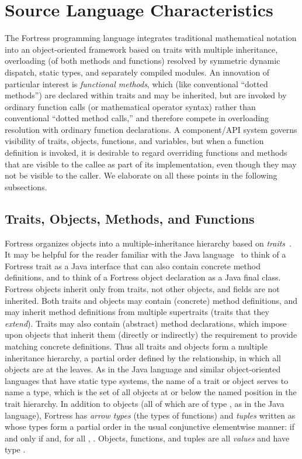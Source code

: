 \section{Source Language Characteristics}

The Fortress programming language integrates traditional mathematical
notation into an object-oriented framework based on traits with
multiple inheritance, overloading (of both methods and functions)
resolved by symmetric dynamic dispatch, static types, and separately
compiled modules.  An innovation of particular interest is
\emph{functional methods}, which (like conventional ``dotted methods'')
are declared within traits and may be inherited, but are invoked by
ordinary function calls (or mathematical operator syntax) rather
than conventional ``dotted method calls,'' and therefore compete
in overloading resolution with ordinary function declarations.
A component/API system governs visibility of traits, objects,
functions, and variables, but when a function definition is invoked,
it is desirable to regard overriding functions and
methods that are visible to the callee as part of its implementation,
even though they may not be visible to the caller.
We elaborate on all these points in the following subsections.

\subsection{Traits, Objects, Methods, and Functions}

Fortress organizes objects into a multiple-inheritance hierarchy based
on {\it traits}~\cite{traits,traitsOOPSLA04}.  It may be helpful for the reader familiar with the Java language~\cite{JLS1}
to think of a Fortress trait as a Java interface that can
also contain concrete method definitions, and
to think of a Fortress object declaration as a Java final class.
Fortress objects inherit only from traits, not other objects,
and fields are not inherited.  Both traits and objects may contain
(concrete) method definitions, and may inherit method definitions
from multiple supertraits (traits that they \emph{extend}).
Traits may also contain (abstract) method declarations, which impose
upon objects that inherit them (directly or indirectly)
the requirement to provide matching concrete definitions.
Thus all traits and objects form a multiple inheritance hierarchy,
a partial order defined by the  relationship,
in which all objects are at the leaves.  As in the Java language and similar object-oriented
languages that have static type systems, the name of a trait or object
serves to name a type, which is the set of all objects at or below
the named position in the trait hierarchy.  In addition to objects
(all of which are of type , as in the Java language), Fortress has
\emph{arrow types}  (the types of functions) and \emph{tuples}
written as  whose types form a partial order
in the usual conjunctive elementwise manner:
 if and only if
 and, for all , .  Objects, functions, and tuples
are all \emph{values} and have type .

